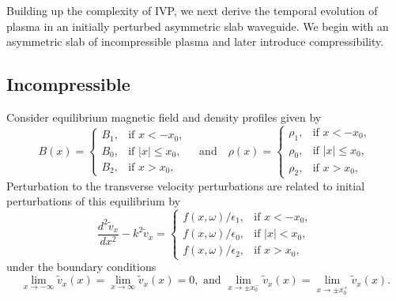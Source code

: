 \documentclass[12pt]{../style-files/ociamthesis}
\begin{document}
Building up the complexity of IVP, we next derive the temporal evolution of plasma in an initially perturbed asymmetric slab waveguide. We begin with an asymmetric slab of incompressible plasma and later introduce compressibility.

\subsection{Incompressible}

Consider equilibrium magnetic field and density profiles given by
\begin{equation}
B(x)=
\begin{cases}
B_1, & \text{if  }x<-x_0, \\
B_0, & \text{if }|x|\leq{x_0}, \\
B_2, & \text{if  }x>x_0,
\end{cases}
\quad \text{and} \quad
\rho(x)=
\begin{cases}
\rho_1, & \text{if  }x<-x_0, \\
\rho_0, & \text{if }|x|\leq{x_0}, \\
\rho_2, & \text{if  }x>x_0,
\end{cases}
\end{equation}
Perturbation to the transverse velocity perturbations are related to initial perturbations of this equilibrium by
\begin{equation}
\frac{d^2\tilde{v}_x}{dx^2} - k^2\tilde{v}_x = 
\begin{cases}
f(x, \omega)/\epsilon_1, & \text{if  } x<-x_0,\\
f(x, \omega)/\epsilon_0, & \text{if  } |x|<x_0,\\
f(x, \omega)/\epsilon_2, & \text{if  } x>x_0,
\end{cases}
\label{ivp gov slab 2}
\end{equation}
under the boundary conditions
\begin{equation}
\lim_{x \to -\infty}\tilde{v}_x(x) = \lim_{x \to \infty}\tilde{v}_x(x) = 0, \text{ and } \lim_{x \to \pm x_0^-}\tilde{v}_x(x) = \lim_{x \to \pm x_0^+}\tilde{v}_x(x).
\label{ivp slab BC}
\end{equation}
\end{document}
